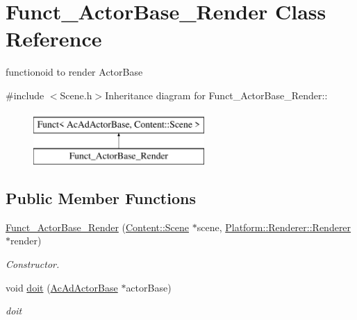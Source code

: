 \hypertarget{classFunct__ActorBase__Render}{
\section{Funct\_\-ActorBase\_\-Render Class Reference}
\label{classFunct__ActorBase__Render}
}


functionoid to render ActorBase  


{\ttfamily \#include $<$Scene.h$>$}Inheritance diagram for Funct\_\-ActorBase\_\-Render::\begin{figure}[H]
\begin{center}
\leavevmode
\includegraphics[height=2cm]{classFunct__ActorBase__Render}
\end{center}
\end{figure}
\subsection*{Public Member Functions}
\begin{DoxyCompactItemize}
\item 
\hypertarget{classFunct__ActorBase__Render_a44c2227cd69281a313cb67f1d2626399}{
\hyperlink{classFunct__ActorBase__Render_a44c2227cd69281a313cb67f1d2626399}{Funct\_\-ActorBase\_\-Render} (\hyperlink{classContent_1_1Scene}{Content::Scene} $\ast$scene, \hyperlink{classPlatform_1_1Renderer_1_1Renderer}{Platform::Renderer::Renderer} $\ast$render)}
\label{classFunct__ActorBase__Render_a44c2227cd69281a313cb67f1d2626399}

\begin{DoxyCompactList}\small\item\em Constructor. \item\end{DoxyCompactList}\item 
\hypertarget{classFunct__ActorBase__Render_af9000db2fc2e4cafbae5a294a7af2132}{
void \hyperlink{classFunct__ActorBase__Render_af9000db2fc2e4cafbae5a294a7af2132}{doit} (\hyperlink{classContent_1_1Actor_1_1Admin_1_1ActorBase}{AcAdActorBase} $\ast$actorBase)}
\label{classFunct__ActorBase__Render_af9000db2fc2e4cafbae5a294a7af2132}

\begin{DoxyCompactList}\small\item\em doit \item\end{DoxyCompactList}\end{DoxyCompactItemize}
